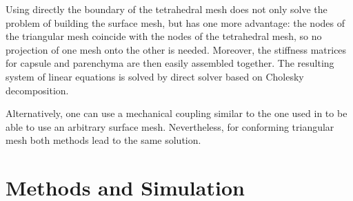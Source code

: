 \documentclass{acm_proc_article-sp}
\newcommand{\CD}[1]{{\color{green}\textbf{CD: #1}}}
\newcommand{\Mat}[1]{\mathbf{#1}}
\begin{document}
Using directly the boundary of the tetrahedral mesh does not only solve the
problem of building the surface mesh, but has one more advantage: the nodes
of the triangular mesh coincide with the nodes of the tetrahedral mesh, so no projection of one mesh onto the other is needed.
Moreover, the stiffness matrices for capsule and parenchyma are then easily assembled
together.
%
The resulting system of linear equations is solved by direct solver based on Cholesky decomposition.

Alternatively, one can use a mechanical coupling similar to the one used in
\cite{Peterlik2012} to be able to use an arbitrary surface mesh. Nevertheless,
for conforming triangular mesh both methods lead to the same solution.




\section{Methods and Simulation} %
\end{document}
